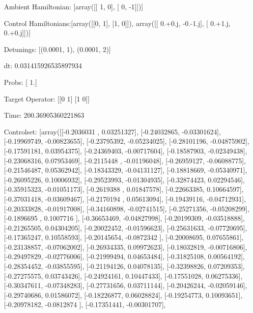 \documentclass{article}
\begin{document}
    

\newpage

Ambient Hamiltonian: [array([[ 1,  0],
       [ 0, -1]])]

Control Hamiltonians:[array([[0, 1],
       [1, 0]]), array([[ 0.+0.j, -0.-1.j],
       [ 0.+1.j,  0.+0.j]])]

Detunings: [(0.0001, 1), (0.0001, 2)]

 dt: 0.031415926535897934

Probs: [ 1.]

Target Operator: [[0 1]
 [1 0]]

Time: 200.36905360221863

Controlset: [array([[-0.2036031 ,  0.03251327],
       [-0.24032865, -0.03301624],
       [-0.19969749, -0.00823655],
       [-0.23795392, -0.05234025],
       [-0.28101196, -0.04875902],
       [-0.17591181,  0.03954375],
       [-0.24369403, -0.00717604],
       [-0.18587903, -0.02349438],
       [-0.23068316,  0.07953469],
       [-0.2115448 , -0.01196048],
       [-0.26959127, -0.06088775],
       [-0.21546487,  0.05362942],
       [-0.18343329, -0.04131127],
       [-0.18818669, -0.05340971],
       [-0.26095226,  0.10006932],
       [-0.29523993, -0.01304935],
       [-0.32874423,  0.02294546],
       [-0.35915323, -0.01051173],
       [-0.2619388 ,  0.01847578],
       [-0.22663385,  0.10664597],
       [-0.37031418, -0.03609467],
       [-0.2170194 ,  0.05613094],
       [-0.19439116, -0.04712931],
       [-0.20333828, -0.01917008],
       [-0.34160898, -0.02741515],
       [-0.25271356, -0.05208299],
       [-0.1896695 ,  0.1007716 ],
       [-0.36653469, -0.04827998],
       [-0.20199309, -0.03518888],
       [-0.21265505,  0.04304205],
       [-0.20022452, -0.01596623],
       [-0.25631633, -0.07720695],
       [-0.17365247,  0.10558593],
       [-0.20145654, -0.0872342 ],
       [-0.20008695,  0.07655861],
       [-0.23138857, -0.07062002],
       [-0.26934335,  0.09972623],
       [-0.18032819, -0.00716806],
       [-0.29497829, -0.02776006],
       [-0.21999494,  0.04653484],
       [-0.31825108,  0.00564192],
       [-0.28354452, -0.03855595],
       [-0.21194126,  0.04078135],
       [-0.32398826,  0.07209353],
       [-0.27275575,  0.03743426],
       [-0.24924161,  0.10447433],
       [-0.17551028,  0.06275336],
       [-0.30347611, -0.07348283],
       [-0.27731656,  0.03711144],
       [-0.20426244, -0.02059146],
       [-0.29740686,  0.01586072],
       [-0.18226877,  0.06028824],
       [-0.19254773,  0.10093651],
       [-0.20978182, -0.0812874 ],
       [-0.17351441, -0.00301707],
\end{document}
